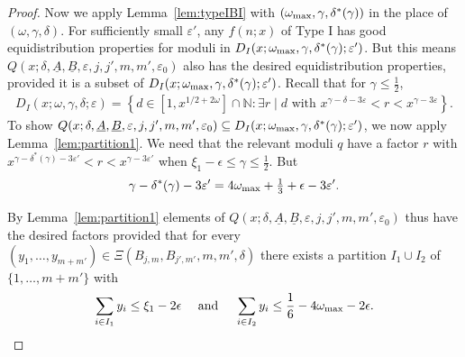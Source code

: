\documentclass{amsart}
\numberwithin{equation}{section}
\begin{document}
\begin{proof}
\medskip Now we   apply Lemma~\ref{lem:typeIBI} with $(\omega_{\begin{scriptsize}
\mbox{max}
\end{scriptsize}}, \gamma, \delta^*(\gamma))$ in the place of $(\omega, \gamma, \delta)$. For sufficiently small $\varepsilon'$,  any $f(n;x)$ of Type I has good equidistribution properties for moduli in  $D_I(x;\omega_{\begin{scriptsize}
\mbox{max}
\end{scriptsize}},\gamma,\delta^*(\gamma);\varepsilon')$. 
But this means $ Q(x;\delta,\underline{A},\underline{B},\varepsilon,j,j',m,m',\varepsilon_0)$ also has the desired equidistribution properties, provided it is a subset of $D_I(x;\omega_{\begin{scriptsize}
\mbox{max}
\end{scriptsize}},\gamma,\delta^*(\gamma);\varepsilon')$.  Recall that for $\gamma \leq \frac{1}{2}$, 
\begin{align*}
D_I(x;\omega,\gamma,\delta;\varepsilon) =
 \left\{d \in  [1, x^{1/2+2\omega}]\cap \mathbb{N}:  \exists r \mid d \mbox{ with } x^{\gamma-\delta -3\varepsilon} < r < x^{\gamma - 3\varepsilon} \right\}.
\end{align*}
 To show $ Q(x;\delta,\underline{A},\underline{B},\varepsilon,j,j',m,m',\varepsilon_0) \subseteq D_I(x;\omega_{\begin{scriptsize}
\mbox{max}
\end{scriptsize}},\gamma,\delta^*(\gamma);\varepsilon')$,  we now apply Lemma~\ref{lem:partition1}. We need that the relevant moduli $q$ have a factor $r$ with $x^{\gamma-\delta^*(\gamma) -3\varepsilon'} < r < x^{\gamma - 3\varepsilon'}$ when $\xi_1 -\epsilon \leq \gamma \leq \frac{1}{2}$. But 
$$   \gamma-\delta^*(\gamma) -3\varepsilon' =  
  4\omega_{\begin{scriptsize}
\mbox{max}
\end{scriptsize}} +\tfrac{1}{3}  +\epsilon -3\varepsilon'.$$


By Lemma~\ref{lem:partition1} elements of  $ Q(x;\delta,\underline{A},\underline{B},\varepsilon,j,j',m,m',\varepsilon_0) $ thus  have the desired factors provided that for  every  $(y_1, \dots, y_{m+m'}) \in \Xi(B_{j,m},B_{j',m'},m,m',\delta)$  there exists a partition $I_1 \cup I_2$ of $\{1, \dots, m+m'\}$ with  
\begin{align*}
\sum_{i \in I_1} y_i \leq \xi_1-2\epsilon \quad \mbox{ and } \quad  \sum_{i \in I_2} y_i \leq  \frac{1}{6}-   4\omega_{\begin{scriptsize}
\mbox{max}
\end{scriptsize}}   -2\epsilon. 
\end{align*}
 

\end{proof}
\end{document}
